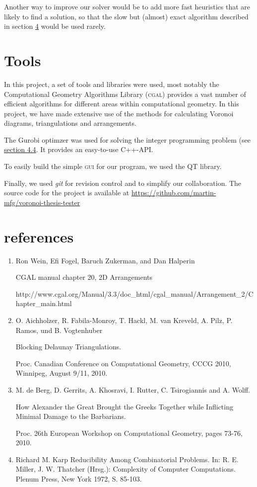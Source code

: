 \documentclass[a4paper,12pt]{article}
\begin{document}
Another way to improve our solver would be to add more fast heuristics that are likely to find a solution, so that the slow but (almost) exact algorithm described in section \hyperref[sec:findPoints]{4} would be used rarely.

\section{Tools}
In this project, a set of tools and libraries were used, most notably the Computational Geometry Algorithms Library (\textsc{cgal}) provides a vast number of efficient algorithms for different areas within computational geometry. In this project, we have made extensive use of the methods for calculating Voronoi diagrams, triangulations and arrangements.

The Gurobi optimzer was used for solving the integer programming problem (see  \hyperref[sec:gurobi]{section 4.4}. It provides an easy-to-use C++-\textsc{API}.

To easily build the simple \textsc{gui} for our program, we used the \textsc{QT} library.

Finally, we used \emph{git} for revision control and to simplify our collaboration. The source code for the project is available at \newline 
\url{https://github.com/martin-mfg/voronoi-thesis-tester}

\section{references}
\small
\begin{enumerate}
\item
\label{ref:cgal}
Ron Wein, Efi Fogel, Baruch Zukerman, and Dan Halperin

CGAL manual chapter 20, 2D Arrangements

http://www.cgal.org/Manual/3.3/doc\_html/cgal\_manual/Arrangement\_2/Chapter\_main.html

\item
\label{ref:blocking}
O. Aichholzer, R. Fabila-Monroy, T. Hackl, M. van Kreveld, A. Pilz, P. Ramos, und B. Vogtenhuber

Blocking Delaunay Triangulations. 

Proc. Canadian Conference on Computational Geometry, CCCG 2010, Winnipeg, August 9/11, 2010. 


\item
\label{ref:alexander}
M. de Berg, D. Gerrits, A. Khosravi, I. Rutter, C. Tsirogiannis and A. Wolff.

How Alexander the Great Brought the Greeks Together while Inflicting Minimal Damage to the Barbarians.

Proc. 26th European Workshop on Computational Geometry, pages 73-76, 2010.

\item
\label{ref:karp}
Richard M. Karp
Reducibility Among Combinatorial Problems.
In: R. E. Miller, J. W. Thatcher (Hrsg.): Complexity of Computer Computations. Plenum Press, New York 1972, S. 85-103.

\end{enumerate}
\end{document}
